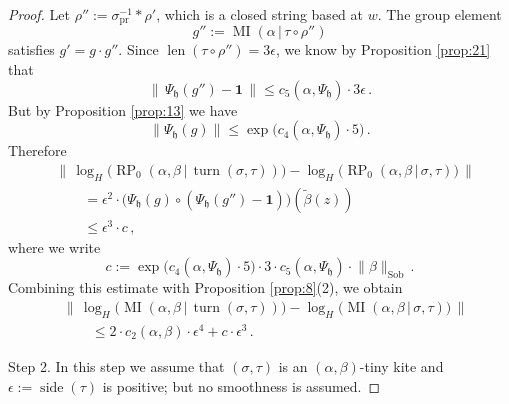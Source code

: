 \documentclass[10pt, a4paper]{amsart}
\theoremstyle{definition}
\numberwithin{equation}{section}
\newcommand{\opn}{\operatorname}
\newcommand{\mfrak}[1]{\mathfrak{#1}}
\newcommand{\mrm}[1]{\mathrm{#1}}
\newcommand{\bsym}[1]{\boldsymbol{#1}}
\newcommand{\til}[1]{\tilde{#1}}
\newcommand{\norm}[1]{\lVert #1 \rVert}
\newcommand{\Norm}[1]{\bigl\lVert\, #1 \, \bigr\rVert}
\renewcommand{\vert}{\, | \,}
\newcommand{\h}{\mfrak{h}}
\begin{document}
\begin{proof}
Let
$\rho'' := \sigma_{\mrm{pr}}^{-1} * \rho'$, 
which is a closed string based at $w$. The group element
\[ g'' := \opn{MI} ( \alpha \vert \tau \circ \rho'' ) \]
satisfies $g' = g \cdot g''$. Since  
$\opn{len}(\tau \circ \rho'') = 3 \epsilon$,
we know by Proposition \ref{prop:21} that 
\[ \Norm{ \Psi_{\h}(g'') - \bsym{1} } \leq 
c_5(\alpha, \Psi_{\h}) \cdot 3 \epsilon \, . \]
But by Proposition \ref{prop:13} we have
\[ \norm{ \Psi_{\h}(g) } \leq  \exp \bigl( c_4(\alpha, \Psi_{\h}) \cdot 5
\bigr) \, . \]
Therefore
\[ \begin{aligned}
& \Norm{ \log_H \bigl(  \opn{RP}_0(\alpha, \beta \vert \opn{turn}(\sigma, \tau))
\bigr) -
\log_H \bigl(  \opn{RP}_0(\alpha, \beta \vert \sigma, \tau) \bigr) } \\
& \qquad = \epsilon^2 \cdot \bigl( \Psi_{\h}(g) \circ 
( \Psi_{\h}(g'') - \bsym{1} ) \bigr) (\til{\beta}(z)) \\
& \qquad \leq
\epsilon^3 \cdot c \, , 
\end{aligned} \]
where we write
\[ c := 
\exp \bigl( c_4(\alpha, \Psi_{\h}) \cdot 5 \bigr) \cdot 
3 \cdot c_5(\alpha, \Psi_{\h}) \cdot \norm{\beta}_{\mrm{Sob}} \, . \]
Combining this estimate with Proposition \ref{prop:8}(2), we obtain
\begin{equation} \label{eqn:191}
\begin{aligned}
& \Norm{ \log_H \bigl(  \opn{MI}(\alpha, \beta \vert \opn{turn}(\sigma, \tau))
\bigr) -
\log_H \bigl(  \opn{MI}(\alpha, \beta \vert \sigma, \tau) \bigr) } \\
& \qquad \leq  2 \cdot c_2(\alpha, \beta) \cdot \epsilon^4 +
c \cdot \epsilon^3 \, .
\end{aligned} 
\end{equation}

\medskip \noindent
Step 2. In this step we assume that $(\sigma, \tau)$ is an
$(\alpha, \beta)$-tiny kite and $\epsilon := \opn{side}(\tau)$ is
positive; but no smoothness is assumed. 


\end{proof}
\end{document}
